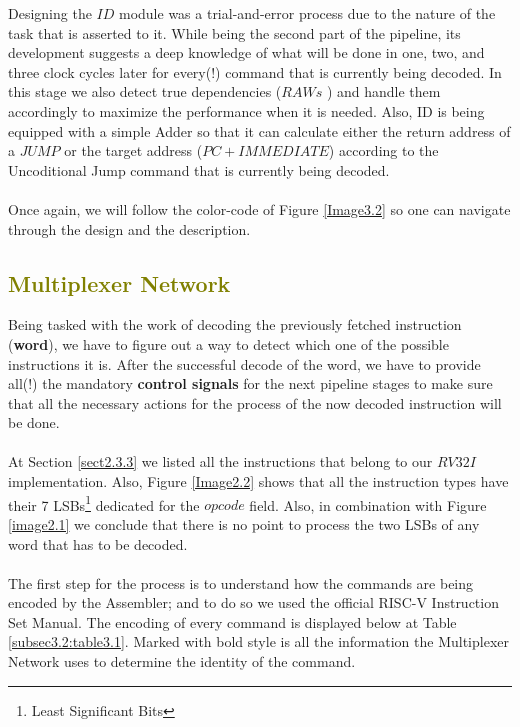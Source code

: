  	Designing the $ID$ module was a trial-and-error process due to the nature of the task that is asserted to it. While being the second part of the pipeline, its development suggests a deep knowledge of what will be done in one, two, and three clock cycles later for every(!) command that is currently being decoded. In this stage we also detect true dependencies ($RAWs$ %
 	) and handle them accordingly to maximize the performance when it is needed. Also, ID is being equipped with a simple \textcolor{byzantium}{Adder} so that it can calculate either the return address of a $JUMP$ or the target address ($PC+IMMEDIATE$) according to the Uncoditional Jump command that is currently being decoded. \\\\
 	Once again, we will follow the color-code of Figure \ref{Image3.2} so one can navigate through the design and the description.
 	
 	\clearpage
 	
 	\subsection{\textcolor{olive}{Multiplexer Network}}
 	\label{subsubsection3.2.1}
 	
 	Being tasked with the work of decoding the previously fetched instruction (\textbf{word}), we have to figure out a way to detect which one of the possible instructions it is. After the successful decode of the word, we have to provide all(!) the mandatory \textbf{control signals} for the next pipeline stages to make sure that all the necessary actions for the process of the now decoded instruction will be done.\\\\ At Section \ref{sect2.3.3} we listed all the instructions that belong to our $RV32I$ implementation. Also, Figure \ref{Image2.2} shows that all the instruction types have their 7 LSBs\footnote{Least Significant Bits} dedicated for the $opcode$ field. Also, in combination with Figure \ref{image2.1} we conclude that there is no point to process the two LSBs of any word that has to be decoded.\\\\
 	The first step for the process is to understand how the commands are being encoded by the Assembler; and to do so we used the official RISC-V Instruction Set Manual. The encoding of every command is displayed below at Table \ref{subsec3.2:table3.1}. Marked with bold style is all the information the Multiplexer Network uses to determine the identity of the command.
 	
